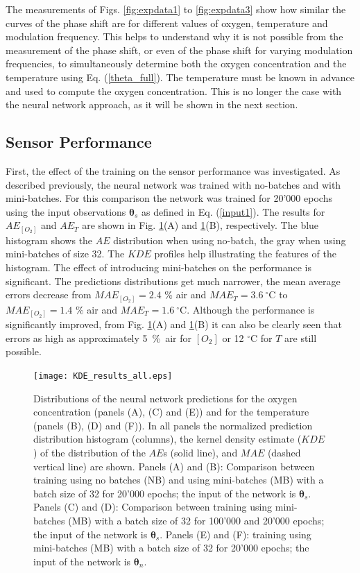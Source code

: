 \documentclass[sensors,article,submit,moreauthors,pdftex,10pt,a4paper]{Definitions/mdpi}
\begin{document}
The measurements of Figs. \ref{fig:expdata1} to \ref{fig:expdata3} show how similar the curves of the phase shift are for different values of oxygen, temperature and modulation frequency. This helps to understand why it is not possible from the measurement of the phase shift, or even of the phase shift for varying modulation frequencies, to simultaneously determine both the oxygen concentration and the temperature using Eq. (\ref{theta_full}). The temperature must be known in advance and used to compute the oxygen concentration. This is no longer the case with the neural network approach, as it will be shown in the next section. 


\subsection{Sensor Performance}

First, the effect of the training on the sensor performance was investigated. As described previously, the neural network was trained with no-batches and with mini-batches. For this comparison the network was trained for 20'000 epochs using the input observations ${\pmb \theta}_s$ as defined in Eq. (\ref{input1}). The results for $AE_{[O_2]}$ and $AE_T$ are shown in Fig. \ref{fig:KDE_results_all}(A) and \ref{fig:KDE_results_all}(B), respectively. The blue histogram shows the $AE$ distribution when using no-batch, the gray when using mini-batches of size 32. The $KDE$ profiles help illustrating the features of the histogram. The effect of introducing mini-batches on the performance is significant. The predictions distributions get much narrower, the mean average errors decrease from $MAE_{[O_2]}=2.4$ \% air and $MAE_{T}=3.6 \ ^\circ$C to $MAE_{[O_2]}=1.4$ \% air and $MAE_{T}=1.6 \ ^\circ$C. Although the performance is significantly improved, from Fig. \ref{fig:KDE_results_all}(A) and \ref{fig:KDE_results_all}(B) it can also be clearly seen that errors as high as approximately 5~\%~air for $[O_2]$ or 12 $^\circ$C for $T$ are still possible.

\begin{figure}[htbp]
\centering
\texttt{[image: KDE\_results\_all.eps]}
\caption{Distributions of the neural network predictions for the oxygen concentration (panels (A), (C) and (E)) and for the temperature (panels (B), (D) and (F)). In all panels the normalized prediction distribution histogram (columns), the kernel density estimate ($KDE$) of the distribution of the $AE$s (solid line), and $MAE$ (dashed vertical line) are shown. Panels (A) and (B): Comparison between training using no batches (NB) and using mini-batches (MB) with a batch size of 32 for 20'000 epochs; the input of the network is ${\pmb \theta}_s$. Panels (C) and (D): Comparison between training using mini-batches (MB) with a batch size of 32 for 100'000 and 20'000 epochs; the input of the network is ${\pmb \theta}_s$. Panels (E) and (F): 
training using mini-batches (MB) with a batch size of 32 for 20'000 epochs; the input of the network is ${\pmb \theta}_n$.}
\label{fig:KDE_results_all}
\end{figure}
\end{document}

